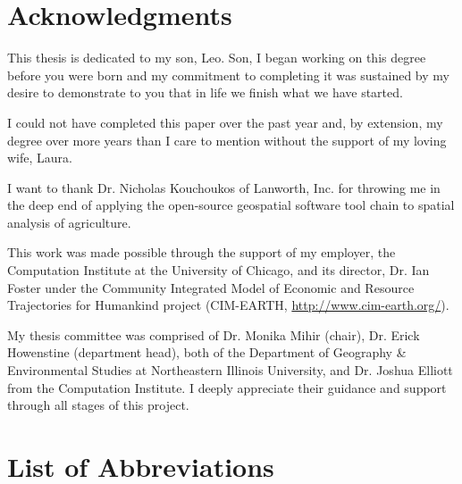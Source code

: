 \documentclass[draftthesis]{neiuthesis}
\begin{document}
\chapter*{Acknowledgments}

\noindent This thesis is dedicated to my son, Leo.  Son, I began
working on this degree before you were born and my commitment to
completing it was sustained by my desire to demonstrate to you that in
life we finish what we have started.

\vspace{12pt}
\noindent I could not have completed this paper over the past year
and, by extension, my degree over more years than I care to mention
without the support of my loving wife, Laura.

\vspace{12pt}
\noindent I want to thank Dr. Nicholas Kouchoukos of Lanworth,
Inc. for throwing me in the deep end of applying the open-source
geospatial software tool chain to spatial analysis of agriculture.

\vspace{12pt}
\noindent This work was made possible through the support of my
employer, the Computation Institute at the University of Chicago, and
its director, Dr. Ian Foster under the Community Integrated Model of
Economic and Resource Trajectories for Humankind project (CIM-EARTH,
\url{http://www.cim-earth.org/}).

\vspace{12pt}
\noindent My thesis committee was comprised of Dr. Monika Mihir
(chair), Dr. Erick Howenstine (department head), both of the
Department of Geography \& Environmental Studies at Northeastern
Illinois University, and Dr. Joshua Elliott from the Computation
Institute.  I deeply appreciate their guidance and support through all
stages of this project.


\tableofcontents 
\listoftables
\listoffigures

\chapter{List of Abbreviations}
\end{document}
